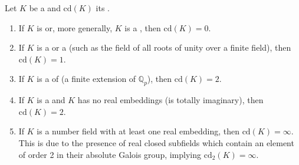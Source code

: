 \begin{theorem} \label{theorem:cohomological_dimensions_of_common_fields}
Let $K$ be a  and $\text{cd}(K)$ its .
\begin{enumerate}
    \item If $K$ is  or, more generally, $K$ is a , then $\text{cd}(K) = 0$.
    \item If $K$ is a  or a  (such as the field of all roots of unity over a finite field), then $\text{cd}(K) = 1$.

    \item If $K$ is a  of  (a finite extension of $\mathbb{Q}_p$), then $\text{cd}(K) = 2$.

    \item If $K$ is a  and $K$ has no real embeddings (is totally imaginary), then $\text{cd}(K) = 2$. 

    \item If $K$ is a number field with at least one real embedding, then $\text{cd}(K) = \infty$. This is due to the presence of real closed subfields which contain an element of order 2 in their absolute Galois group, implying $\text{cd}_2(K) = \infty$.
\end{enumerate}
\end{theorem}